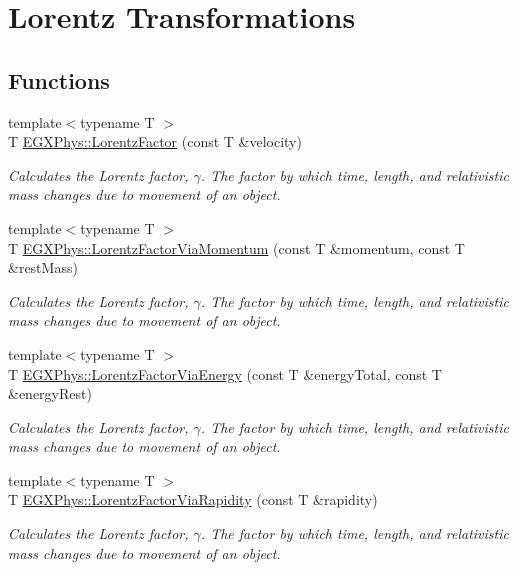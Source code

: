 \hypertarget{group___e_g_x_phys-_lorentz_transformations}{}\section{Lorentz Transformations}
\label{group___e_g_x_phys-_lorentz_transformations}
\subsection*{Functions}
\begin{DoxyCompactItemize}
\item 
{\footnotesize template$<$typename T $>$ }\\T \mbox{\hyperlink{group___e_g_x_phys-_lorentz_transformations_ga5f9b11c1f4c3ae26a7e64f02c22d5a75}{E\+G\+X\+Phys\+::\+Lorentz\+Factor}} (const T \&velocity)
\begin{DoxyCompactList}\small\item\em Calculates the Lorentz factor, $\gamma$. The factor by which time, length, and relativistic mass changes due to movement of an object. \end{DoxyCompactList}\item 
{\footnotesize template$<$typename T $>$ }\\T \mbox{\hyperlink{group___e_g_x_phys-_lorentz_transformations_ga1ea24128654ac333dd843afdd5c003b7}{E\+G\+X\+Phys\+::\+Lorentz\+Factor\+Via\+Momentum}} (const T \&momentum, const T \&rest\+Mass)
\begin{DoxyCompactList}\small\item\em Calculates the Lorentz factor, $\gamma$. The factor by which time, length, and relativistic mass changes due to movement of an object. \end{DoxyCompactList}\item 
{\footnotesize template$<$typename T $>$ }\\T \mbox{\hyperlink{group___e_g_x_phys-_lorentz_transformations_ga601de8c039be89a9abea22bc459436c9}{E\+G\+X\+Phys\+::\+Lorentz\+Factor\+Via\+Energy}} (const T \&energy\+Total, const T \&energy\+Rest)
\begin{DoxyCompactList}\small\item\em Calculates the Lorentz factor, $\gamma$. The factor by which time, length, and relativistic mass changes due to movement of an object. \end{DoxyCompactList}\item 
{\footnotesize template$<$typename T $>$ }\\T \mbox{\hyperlink{group___e_g_x_phys-_lorentz_transformations_ga8064f5bce1d2ca5f7bc39d95ba4d2dd9}{E\+G\+X\+Phys\+::\+Lorentz\+Factor\+Via\+Rapidity}} (const T \&rapidity)
\begin{DoxyCompactList}\small\item\em Calculates the Lorentz factor, $\gamma$. The factor by which time, length, and relativistic mass changes due to movement of an object. \end{DoxyCompactList}\end{DoxyCompactItemize}


